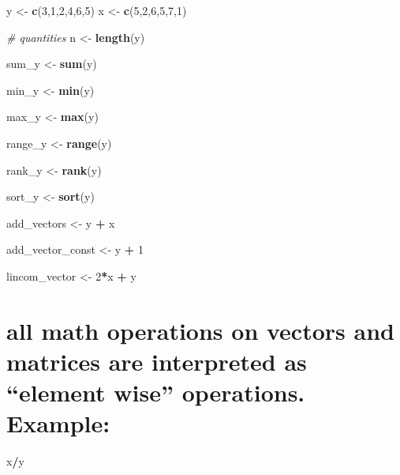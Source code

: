 \documentclass[]{article}
\newenvironment{Shaded}{\begin{snugshade}}{\end{snugshade}}
\newcommand{\KeywordTok}[1]{\textcolor[rgb]{0.13,0.29,0.53}{\textbf{#1}}}
\newcommand{\DecValTok}[1]{\textcolor[rgb]{0.00,0.00,0.81}{#1}}
\newcommand{\StringTok}[1]{\textcolor[rgb]{0.31,0.60,0.02}{#1}}
\newcommand{\CommentTok}[1]{\textcolor[rgb]{0.56,0.35,0.01}{\textit{#1}}}
\newcommand{\OperatorTok}[1]{\textcolor[rgb]{0.81,0.36,0.00}{\textbf{#1}}}
\newcommand{\NormalTok}[1]{#1}
\begin{document}
\begin{Shaded}
\begin{Highlighting}[]
\NormalTok{y <-}\StringTok{ }\KeywordTok{c}\NormalTok{(}\DecValTok{3}\NormalTok{,}\DecValTok{1}\NormalTok{,}\DecValTok{2}\NormalTok{,}\DecValTok{4}\NormalTok{,}\DecValTok{6}\NormalTok{,}\DecValTok{5}\NormalTok{)}
\NormalTok{x <-}\StringTok{ }\KeywordTok{c}\NormalTok{(}\DecValTok{5}\NormalTok{,}\DecValTok{2}\NormalTok{,}\DecValTok{6}\NormalTok{,}\DecValTok{5}\NormalTok{,}\DecValTok{7}\NormalTok{,}\DecValTok{1}\NormalTok{)}


\CommentTok{# quantities }
\NormalTok{n <-}\StringTok{ }\KeywordTok{length}\NormalTok{(y)}

\NormalTok{sum_y <-}\StringTok{ }\KeywordTok{sum}\NormalTok{(y)}

\NormalTok{min_y <-}\StringTok{ }\KeywordTok{min}\NormalTok{(y)}

\NormalTok{max_y <-}\StringTok{ }\KeywordTok{max}\NormalTok{(y)}

\NormalTok{range_y <-}\StringTok{ }\KeywordTok{range}\NormalTok{(y)}

\NormalTok{rank_y <-}\StringTok{ }\KeywordTok{rank}\NormalTok{(y)}

\NormalTok{sort_y <-}\StringTok{ }\KeywordTok{sort}\NormalTok{(y)}

\NormalTok{add_vectors  <-}\StringTok{ }\NormalTok{y }\OperatorTok{+}\StringTok{ }\NormalTok{x}

\NormalTok{add_vector_const <-}\StringTok{ }\NormalTok{y }\OperatorTok{+}\StringTok{ }\DecValTok{1}

\NormalTok{lincom_vector <-}\StringTok{ }\DecValTok{2}\OperatorTok{*}\NormalTok{x }\OperatorTok{+}\StringTok{ }\NormalTok{y}
\end{Highlighting}
\end{Shaded}

\section{\texorpdfstring{all math operations on vectors and matrices are
interpreted as ``element wise'' operations.
Example:}{all math operations on vectors and matrices are interpreted as element wise operations. Example:}}\label{all-math-operations-on-vectors-and-matrices-are-interpreted-as-element-wise-operations.-example}

\begin{Shaded}
\begin{Highlighting}[]
\NormalTok{x}\OperatorTok{/}\NormalTok{y}
\end{Highlighting}
\end{Shaded}
\end{document}
